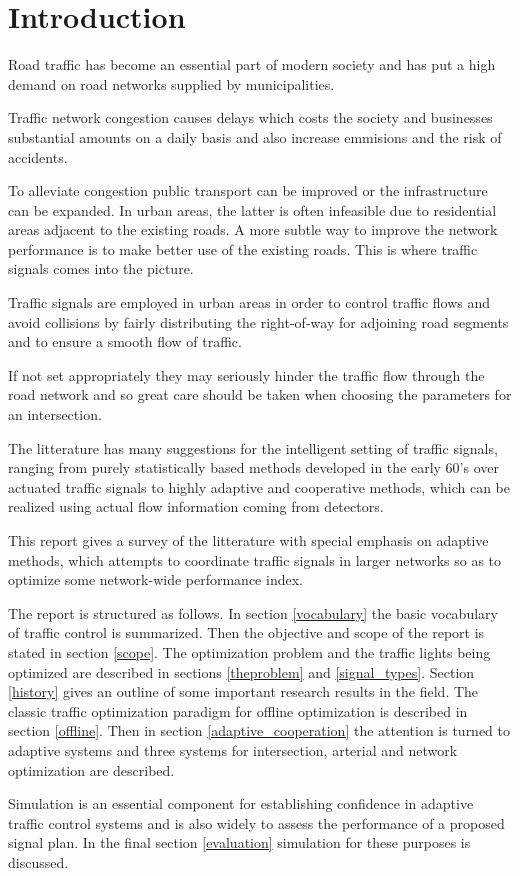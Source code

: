 \section{Introduction}
Road traffic has become an essential part of modern society and has put a high demand on road networks supplied by municipalities. 

Traffic network congestion causes delays which costs the society and businesses substantial amounts on a daily basis and also increase emmisions and the risk of accidents.

To alleviate congestion public transport can be improved or the infrastructure can be expanded. In urban areas, the latter is often infeasible due to residential areas adjacent to the existing roads. 
A more subtle way to improve the network performance is to make better use of the existing roads. This is where traffic signals comes into the picture. 

Traffic signals are employed in urban areas in order to control traffic flows and avoid collisions by fairly distributing the right-of-way for adjoining road segments and to ensure a smooth flow of traffic.

If not set appropriately they may seriously hinder the traffic flow through the road network and so great care should be taken when choosing the parameters for an intersection. 

The litterature has many suggestions for the intelligent setting of traffic signals, ranging from purely statistically based methods developed in the early 60's over actuated traffic signals to highly adaptive and cooperative methods, which can be realized using actual flow information coming from detectors. 

This report gives a survey of the litterature with special emphasis on adaptive methods, which attempts to coordinate traffic signals in larger networks so as to optimize some network-wide performance index. 

The report is structured as follows. In section \ref{vocabulary} the basic vocabulary of traffic control is summarized. Then the objective and scope of the report is stated in section \ref{scope}. 
The optimization problem and the traffic lights being optimized are described in sections \ref{theproblem} and \ref{signal_types}.
Section \ref{history} gives an outline of some important research results in the field. 
The classic traffic optimization paradigm for offline optimization is described in section \ref{offline}.
Then in section \ref{adaptive_cooperation} the attention is turned to adaptive systems and three systems for intersection, arterial and network optimization are described. 

Simulation is an essential component for establishing confidence in adaptive traffic control systems and is also widely to assess the performance of a proposed signal plan. In the final section \ref{evaluation} simulation for these purposes is discussed.